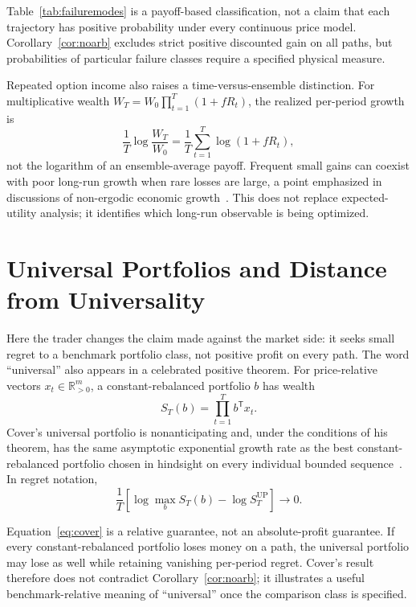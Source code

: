 \documentclass[aps,pra,reprint,superscriptaddress,amsmath,amssymb,floatfix]{revtex4-2}
\theoremstyle{plain}
\theoremstyle{definition}
\theoremstyle{remark}
\begin{document}
Table~\ref{tab:failuremodes} is a payoff-based classification, not a claim
that each trajectory has positive probability under every continuous price
model. Corollary~\ref{cor:noarb} excludes strict positive discounted gain on
all paths, but probabilities of particular failure classes require a specified
physical measure.

Repeated option income also raises a time-versus-ensemble distinction. For
multiplicative wealth \(W_T=W_0\prod_{t=1}^T(1+fR_t)\), the realized
per-period growth is
\[
  \frac1T\log\frac{W_T}{W_0}
  =\frac1T\sum_{t=1}^T\log(1+fR_t),
\]
not the logarithm of an ensemble-average payoff. Frequent small gains can
coexist with poor long-run growth when rare losses are large, a point emphasized
in discussions of non-ergodic economic growth~\cite{Peters2019}. This does not
replace expected-utility analysis; it identifies which long-run observable is
being optimized.

\section{Universal Portfolios and Distance from Universality}
\label{sec:cover}

Here the trader changes the claim made against the market side: it seeks small
regret to a benchmark portfolio class, not positive profit on every path. The
word ``universal'' also appears in a celebrated positive theorem.
For price-relative vectors \(x_t\in\mathbb{R}_{>0}^m\), a constant-rebalanced
portfolio \(b\) has wealth
\[
  S_T(b)=\prod_{t=1}^T b^\mathsf{T}x_t.
\]
Cover's universal portfolio is nonanticipating and, under the conditions of
his theorem, has the same asymptotic exponential growth rate as the best
constant-rebalanced portfolio chosen in hindsight on every individual bounded
sequence~\cite{Cover1991}. In regret notation,
\begin{equation}
  \frac1T\left[
  \log\max_{b}S_T(b)-\log S_T^{\mathrm{UP}}
  \right]\longrightarrow0.
  \label{eq:cover}
\end{equation}

Equation~\eqref{eq:cover} is a relative guarantee, not an absolute-profit
guarantee. If every constant-rebalanced portfolio loses money on a path, the
universal portfolio may lose as well while retaining vanishing per-period
regret. Cover's result therefore does not contradict
Corollary~\ref{cor:noarb}; it illustrates a useful benchmark-relative meaning
of ``universal'' once the comparison class is specified.
\end{document}
